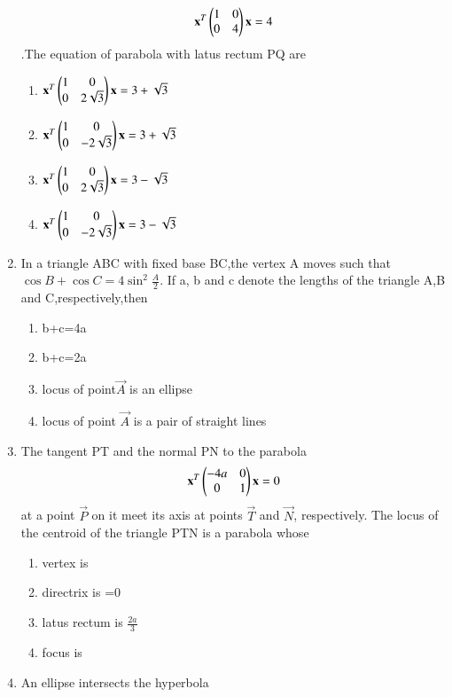 \documentclass[journal,12pt,twocolumn]{IEEEtran}
\begin{document}
\begin{enumerate}[label=\arabic*]
\begin{align}
    \mathbf{x}^T\begin{pmatrix}1& 0 \\0 & 4\end{pmatrix} \mathbf{x}=4
    \end{align}.The equation of parabola with latus rectum PQ are
    \begin{enumerate}
    \item $\mathbf{x}^T \begin{pmatrix} 1& 0 \\0 & 2\sqrt{3} \end{pmatrix} \mathbf{x}=3+\sqrt{3}$
    \item $\mathbf{x}^T \begin{pmatrix}1& 0 \\0 & -2\sqrt{3}\end{pmatrix} \mathbf{x}=3+\sqrt{3}$
    \item $\mathbf{x}^T \begin{pmatrix}1& 0 \\0 & 2\sqrt{3}\end{pmatrix}\mathbf{x}=3-\sqrt{3}$
    \item $\mathbf{x}^T\begin{pmatrix}1& 0 \\0 & -2\sqrt{3} \end{pmatrix}\mathbf{x}=3-\sqrt{3}$
    \end{enumerate}
    \item In a triangle ABC with fixed base BC,the vertex A moves such that 
    $\cos B+\cos C=4\sin^2\frac{A}{2}$. If a, b and c denote the lengths of the triangle 
    A,B and C,respectively,then 
    \begin{enumerate}
    \item b+c=4a
    \item b+c=2a
    \item locus of point$\vec{A}$ is an ellipse
    \item locus of point $\vec{A}$ is a pair of straight lines
    \end{enumerate}
    \item The tangent PT and the normal PN to the parabola
    \begin{align}
    \mathbf{x}^T \begin{pmatrix}-4a& 0 \\0 & 1\end{pmatrix}\mathbf{x}=0
    \end{align}at a point $\vec{P}$ on it meet its axis at points $\vec{T}$ and $\vec{N}$, 	respectively. The locus of the centroid of the triangle PTN is a parabola whose
    \begin{enumerate}
    \item vertex is 
    \item directrix is =0
    \item latus rectum is $\frac{2a}{3}$
    \item focus is 
    \end{enumerate}
    \item An ellipse intersects the hyperbola

\end{enumerate}
\end{document}
